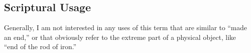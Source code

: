 

\subsection{Scriptural Usage} %
	\label{END-SCRIPTURES}
	
	Generally, I am not interested in any uses of this term that are similar to ``made an end,'' or that obviously refer to the extreme part of a physical object, like ``end of the rod of iron.''

	
	
			
			
		
			
